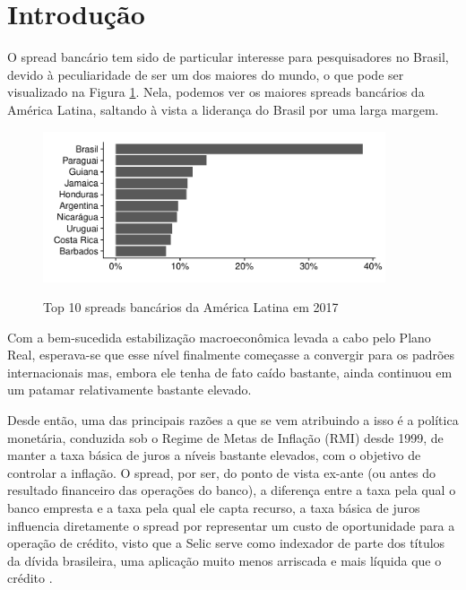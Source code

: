 \documentclass[a4paper, article, 12pt, openany, oneside, english, brazil]{abntex2}
\begin{document}
\imprimircapa
\imprimirfolhaderosto

\tableofcontents*
\cleardoublepage

\textual

\section{Introdução}

    O spread bancário tem sido de particular interesse para pesquisadores no Brasil, devido à peculiaridade de ser um dos maiores do mundo, o que pode ser visualizado na Figura \ref{spreadal}. Nela, podemos ver os maiores spreads bancários da América Latina, saltando à vista a liderança do Brasil por uma larga margem.

\begin{figure}[h]
  \centering
    \caption{Top 10 spreads bancários da América Latina em 2017}
      \includegraphics[width = 0.9\textwidth, scale=1]{spread_AL.pdf}
      \label{spreadal}
\end{figure}
    
    Com a bem-sucedida estabilização macroeconômica levada a cabo pelo Plano Real, esperava-se que esse nível finalmente começasse a convergir para os padrões internacionais mas, embora ele tenha de fato caído bastante, ainda continuou em um patamar relativamente bastante elevado.

    Desde então, uma das principais razões a que se vem atribuindo a isso é a política monetária, conduzida sob o Regime de Metas de Inflação (RMI) desde 1999, de manter a taxa básica de juros a níveis bastante elevados, com o objetivo de controlar a inflação. O spread, por ser, do ponto de vista ex-ante (ou antes do resultado financeiro das operações do banco), a diferença entre a taxa pela qual o banco empresta e a taxa pela qual ele capta recurso, a taxa básica de juros influencia diretamente o spread por representar um custo de oportunidade para a operação de crédito, visto que a Selic serve como indexador de parte dos títulos da dívida brasileira, uma aplicação muito menos arriscada e mais líquida que o crédito \cite[p.~7]{manhica12}.
\end{document}
